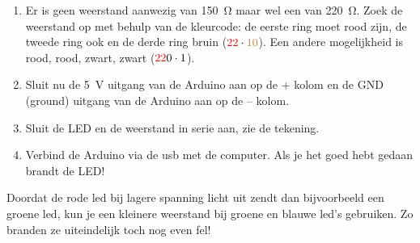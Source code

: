 \documentclass{arduino}
\begin{document}
\begin{minipage}[m]{0.6\textwidth}
\begin{enumerate}[label={\alph*})]
\item Er is geen weerstand aanwezig van \SI{150}{\ohm} maar wel een van \SI{220}{\ohm}. Zoek de weerstand op met behulp van de kleurcode: de eerste ring moet rood zijn, de tweede ring ook en de derde ring bruin ($\textcolor{red}{2}\textcolor{red}{2} \cdot \textcolor{brown}{10}$). Een andere mogelijkheid is rood, rood, zwart, zwart ($\textcolor{red}{2}\textcolor{red}{2}\textcolor{black}{0} \cdot \textcolor{black}{1}$).

\item Sluit nu de \SI{5}{\volt} uitgang van de Arduino aan op de + kolom en de GND (ground) uitgang van de Arduino aan op de – kolom.

\item Sluit de LED en de weerstand in serie aan, zie de tekening.

\item Verbind de Arduino via de usb met de computer. Als je het goed hebt gedaan brandt de LED!
\end{enumerate}

Doordat de rode led bij lagere spanning licht uit zendt dan bijvoorbeeld een groene led, kun je een kleinere weerstand bij groene en blauwe led’s gebruiken. Zo branden ze uiteindelijk toch nog even fel!


\end{minipage}
\end{document}
